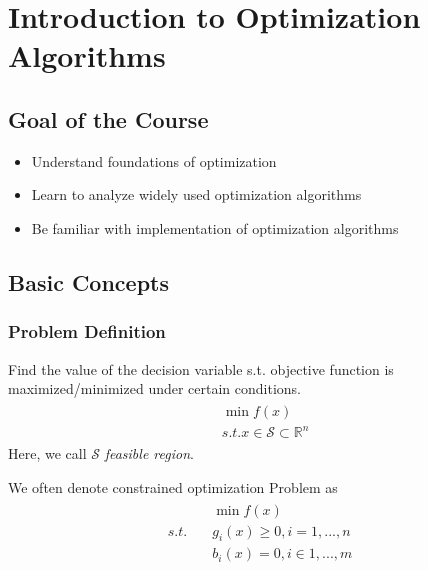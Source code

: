 
\chapter{Introduction to Optimization Algorithms}
\section{Goal of the Course}
\begin{itemize}
    \item Understand foundations of optimization
    \item Learn to analyze widely used optimization algorithms
    \item Be familiar with implementation of optimization algorithms
\end{itemize}


\section{Basic Concepts}
\subsection{Problem Definition}
Find the value of the decision variable s.t.
objective function is maximized/minimized
under certain conditions.
\begin{align}
    \begin{array}{ll}
        & \min f(x) \\
        & s.t. x \in \mathcal{S} \subset \mathbb{R}^n
    \end{array}
\end{align}
Here, we call $\mathcal{S}$ \textit{feasible region}.
\par
We often denote constrained optimization Problem
 as 
\begin{align}
    \begin{array}{lll}
        & \min f(x) \\
        s.t.\quad & g_i(x) \geq 0, i = 1,..., n \\
        & b_i(x) = 0, i \in 1, ..., m
    \end{array}
\end{align}

